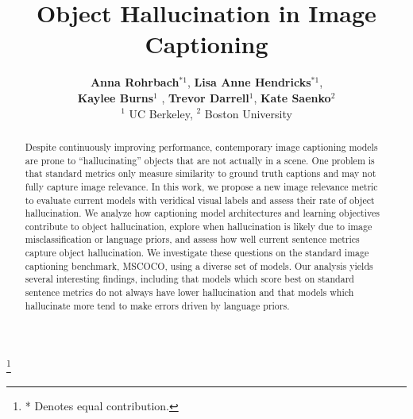 \documentclass[11pt,a4paper]{article}
\title{Object Hallucination in Image Captioning}
\author{\textbf{Anna Rohrbach}$^{*1}$,
\textbf{Lisa Anne Hendricks}$^{*1}$,\\
\textbf{Kaylee Burns}$^{1}$ ,
\textbf{Trevor Darrell}$^1$,
\textbf{Kate Saenko}$^2$\\
$^1$ UC Berkeley, $^2$ Boston University \\
}
\date{}
\newcommand\blfootnote[1]{%
  \begingroup
  \renewcommand\thefootnote{}\footnote{#1}%
  \addtocounter{footnote}{-1}%
  \endgroup
}
\begin{document}
\maketitle
\blfootnote{* Denotes equal contribution.}
\begin{abstract} 
%
%
%
%
Despite continuously improving performance, contemporary image captioning models are prone to ``hallucinating'' objects that are not actually in a scene. One problem is that standard metrics only measure similarity to ground truth captions and may not fully capture image relevance. In this work, we propose a new image relevance metric to evaluate current models with veridical visual labels and assess their rate of object hallucination. We analyze how captioning model architectures and learning objectives contribute to object hallucination, explore when hallucination is likely due to image misclassification or language priors, and assess how well current sentence metrics capture object hallucination. We investigate these questions on the standard image captioning benchmark, MSCOCO, using a diverse set of models. 
%
%
Our analysis yields several interesting findings, including that models which score best on standard sentence metrics do not always have lower hallucination and that models which hallucinate more tend to make errors driven by language priors.
%
%
\end{abstract}



%









\end{document}
